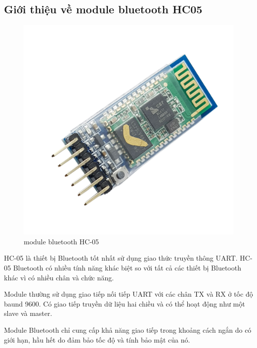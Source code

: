 \subsection{Giới thiệu về module bluetooth HC05}
\begin{figure}[H]
    \centering
    \includegraphics[width=\textwidth,height=\textheight,keepaspectratio]{Images/Theoretical basis/hc05.jpg}
    \caption{module bluetooth HC-05}
    \label{fig:capacitive_sensor}
\end{figure}

HC-05 là thiết bị Bluetooth tốt nhất sử dụng giao thức truyền thông UART. HC-05 Bluetooth có nhiều tính năng khác biệt so với tất cả các thiết bị Bluetooth khác vì có nhiều chân và chức năng.

Module thường sử dụng giao tiếp nối tiếp UART với các chân TX và RX ở tốc độ baund 9600. Có giao tiếp truyền dữ liệu hai chiều và có thể hoạt động như một slave và master.

Module Bluetooth chỉ cung cấp khả năng giao tiếp trong khoảng cách ngắn do có giới hạn, hầu hết do đảm bảo tốc độ và tính bảo mật của nó.

